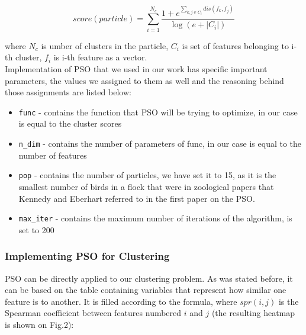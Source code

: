 \documentclass[conference]{IEEEtran}
\begin{document}
\begin{equation}
	score(particle)=\sum_{i=1}^{N_c}\dfrac{1+e^{\sum_{k, j\in C_i}^{}dis(f_k, f_j)}}{\log(e+|C_i|)}
\end{equation}

where $N_c$ is umber of clusters in the particle, $C_i$ is set of features belonging to i-th cluster, $f_i$ is i-th feature as a vector.\\

Implementation of PSO that we used in our work has specific important parameters, the values we assigned to them as well and the reasoning behind those assignments are listed below:
\begin{itemize}
	\item \texttt{func} - contains the function that PSO will be trying to optimize, in our case is equal to the cluster scores
	\item \texttt{n\_dim} - contains the number of parameters of func, in our case is equal to the number of features
	\item \texttt{pop} - contains the number of particles, we have set it to 15, as it is the smallest number of birds in a flock that were in zoological papers that Kennedy and Eberhart referred to in the first paper on the PSO\cite{piotrowski2020population}.
	\item \texttt{max\_iter} - contains the maximum number of iterations of the algorithm, is set to 200
	
\end{itemize}

\subsubsection{Implementing PSO for Clustering}

PSO can be directly applied to our clustering problem. As was stated before, it can be based on the table containing variables that represent how similar one feature is to another. It is filled according to the formula, where $spr(i, j)$ is the Spearman coefficient between features numbered $i$ and $j$ (the resulting heatmap is shown on Fig.2):
\end{document}
